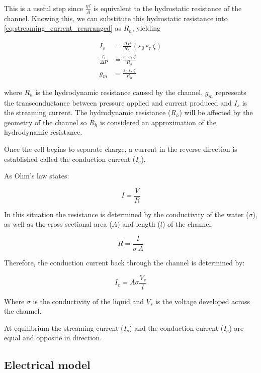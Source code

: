 This is a useful step since $\frac{\eta\,l}{A}$ is equivalent to the hydrostatic resistance of the channel.
Knowing this, we can substitute this hydrostatic resistance into \cref{eq:streaming_current_rearranged} as $R_{h}$, yielding

\begin{align}
    I_{s} & = \frac{\Delta P}{R_{h}}\,\left(\varepsilon_{0}\,\varepsilon_{r}\,\zeta\right)\nonumber\\
    \frac{I_{s}}{\Delta P} & =\frac{\varepsilon_{0}\,\varepsilon_{r}\,\zeta}{R_{h}}\nonumber \\
    g_{m} & = \frac{\varepsilon_{0}\,\varepsilon_{r}\,\zeta}{R_{h}}
\end{align}

where $R_{h}$ is the hydrodynamic resistance caused by the channel, $g_{m}$ represents the transconductance between pressure applied and current produced and $I_{s}$ is the streaming current.
The hydrodynamic resistance ($R_{h}$) will be affected by the geometry of the channel so $R_{h}$ is considered an approximation of the hydrodynamic resistance.

Once the cell begins to separate charge, a current in the reverse direction is established called the conduction current ($I_{c}$).

As Ohm's law states:

\[ I=\frac{V}{R} \]

In this situation the resistance is determined by the conductivity of the water
($\sigma$), as well as the cross sectional area ($A$) and length ($l$) of the
channel.

\[ R=\frac{l}{\sigma\, A} \]


Therefore, the conduction current back through the channel is determined by:

\begin{equation} I_{c}=A\sigma\frac{V_{s}}{l} \end{equation}


Where $\sigma$ is the conductivity of the liquid and $V_{s}$ is the voltage
developed across the channel.

At equilibrium the streaming current ($I_{s}$) and the conduction current
($I_{c}$) are equal and opposite in direction.


\subsection{\label{sub:Electrical-model}Electrical model}


